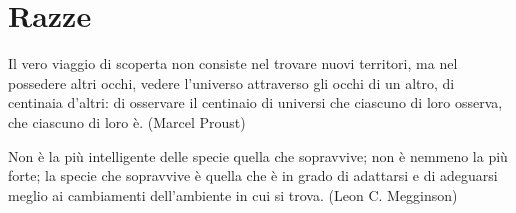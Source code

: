\section{Razze}

\begin{enfasi}{Il vero viaggio di scoperta non consiste nel trovare nuovi territori, ma nel possedere altri occhi, vedere l'universo attraverso gli occhi di un altro, di centinaia d'altri: di osservare il centinaio di universi che ciascuno di loro osserva, che ciascuno di loro è. (Marcel Proust)

\medskip

Non è la più intelligente delle specie quella che sopravvive; non è nemmeno la più forte; la specie che sopravvive è quella che è in grado di adattarsi e di adeguarsi meglio ai cambiamenti dell'ambiente in cui si trova. (Leon C. Megginson)}\end{enfasi}\medskip

